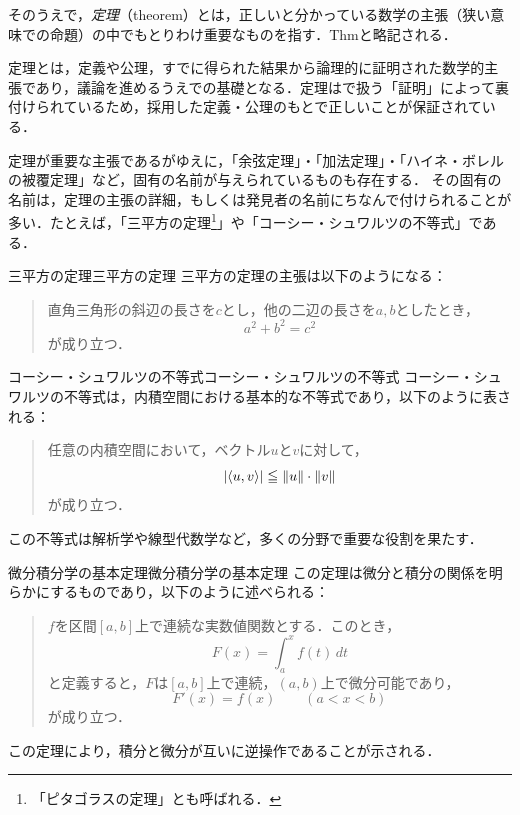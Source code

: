 そのうえで，\emph{定理}（theorem）とは，正しいと分かっている数学の主張（狭い意味での命題）の中でもとりわけ重要なものを指す．Thmと略記される．


定理とは，定義や公理，すでに得られた結果から論理的に証明された数学的主張であり，議論を進めるうえでの基礎となる．定理はで扱う「証明」によって裏付けられているため，採用した定義・公理のもとで正しいことが保証されている．

定理が重要な主張であるがゆえに，「余弦定理」・「加法定理」・「ハイネ・ボレルの被覆定理」など，固有の名前が与えられているものも存在する．
その固有の名前は，定理の主張の詳細，もしくは発見者の名前にちなんで付けられることが多い．たとえば，「三平方の定理\footnote{「ピタゴラスの定理」とも呼ばれる．}」や「コーシー・シュワルツの不等式」である．

\begin{example}{三平方の定理}{三平方の定理}
  三平方の定理の主張は以下のようになる：
  \begin{quotation}
    直角三角形の斜辺の長さを$c$とし，他の二辺の長さを$a,b$としたとき，
    \[
      a^2+b^2=c^2
    \]
    が成り立つ．
  \end{quotation}
\end{example}

\begin{example}{コーシー・シュワルツの不等式}{コーシー・シュワルツの不等式}
  コーシー・シュワルツの不等式は，内積空間における基本的な不等式であり，以下のように表される：
  \begin{quotation}
    任意の内積空間において，ベクトル$u$と$v$に対して，
    \[
      \lvert\langle u, v \rangle\rvert \leqq \lVert u\rVert \cdot \lVert v\rVert
    \]
    が成り立つ．
  \end{quotation}
  この不等式は解析学や線型代数学など，多くの分野で重要な役割を果たす．
\end{example}

\begin{example}{微分積分学の基本定理}{微分積分学の基本定理}
  この定理は微分と積分の関係を明らかにするものであり，以下のように述べられる：
  \begin{quotation}
    $f$を区間$[a, b]$上で連続な実数値関数とする．このとき，
    \[
      F(x) = \int_a^x f(t) \, dt
    \]
    と定義すると，$F$は$[a, b]$上で連続，$(a, b)$上で微分可能であり，
    \[
      F'(x) = f(x) \qquad (a < x < b)
    \]
    が成り立つ．
  \end{quotation}
  この定理により，積分と微分が互いに逆操作であることが示される．
\end{example}
